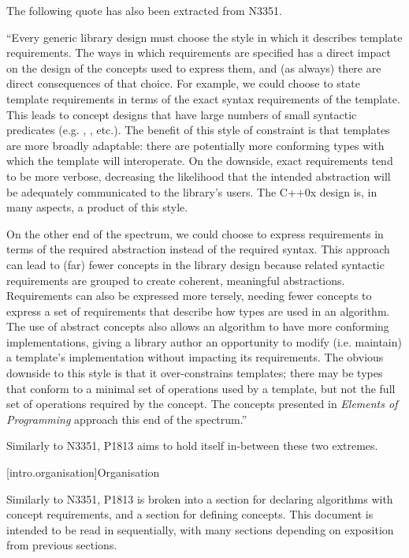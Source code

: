 The following quote has also been extracted from N3351.

``Every generic library design must choose the style in which it describes template requirements.
The ways in which requirements are specified has a direct impact on the design of the concepts
used to express them, and (as always) there are direct consequences of that choice. For example,
we could choose to state template requirements in terms of the exact syntax requirements of the
template. This leads to concept designs that have large numbers of small syntactic predicates (e.g.
, , etc.). The benefit of this style of constraint is that templates
are more broadly adaptable: there are potentially more conforming types with which the template will
interoperate. On the downside, exact requirements tend to be more verbose, decreasing the
likelihood that the intended abstraction will be adequately communicated to the library’s users.
The C++0x design is, in many aspects, a product of this style.

On the other end of the spectrum, we could choose to express requirements in terms of the required
abstraction instead of the required syntax. This approach can lead to (far) fewer concepts in the
library design because related syntactic requirements are grouped to create coherent, meaningful
abstractions. Requirements can also be expressed more tersely, needing fewer concepts to express a
set of requirements that describe how types are used in an algorithm. The use of abstract concepts
also allows an algorithm to have more conforming implementations, giving a library author an
opportunity to modify (i.e. maintain) a template’s implementation without impacting its
requirements. The obvious downside to this style is that it over-constrains templates; there may
be types that conform to a minimal set of operations used by a template, but not the full set of
operations required by the concept. The concepts presented in \textit{Elements of Programming}
approach this end of the spectrum.''

Similarly to N3351, P1813 aims to hold itself in-between these two extremes.

[intro.organisation]{Organisation}

Similarly to N3351, P1813 is broken into a section for declaring algorithms with concept
requirements, and a section for defining concepts. This document is intended to be read in
sequentially, with many sections depending on exposition from previous sections.

